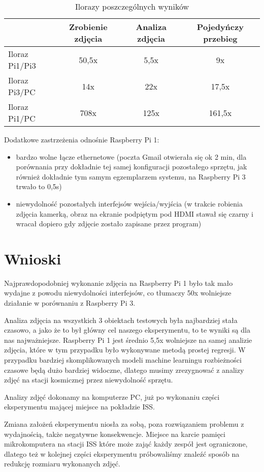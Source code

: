 \begin{table}[H]
    \centering
    \begin{threeparttable}
        \caption{Ilorazy poszczególnych wyników}
        \begin{tabular}{|lccc|}
            \toprule
            & Zrobienie zdjęcia & Analiza zdjęcia & Pojedyńczy przebieg \\
            \midrule
            Iloraz Pi1/Pi3 & 50,5x & 5,5x & 9x \\
            Iloraz Pi3/PC & 14x & 22x & 17,5x \\
            Iloraz Pi1/PC & 708x & 125x & 161,5x \\
            \bottomrule
        \end{tabular}
    \end{threeparttable}
\end{table}

\large Dodatkowe zastrzeżenia odnośnie Raspberry Pi 1: \normalsize
\begin{itemize}
    \item bardzo wolne łącze ethernetowe
    \footnotesize (poczta Gmail otwierała się ok 2 min, dla porównania przy dokładnie
    tej samej konfiguracji pozostałego sprzętu, jak również dokładnie tym samym egzemplarzem systemu, na
    Raspberry Pi 3 trwało to 0,5s) \normalsize \\
    \item niewydolność pozostałych interfejsów wejścia/wyjścia
    \footnotesize (w trakcie robienia zdjęcia kamerką, obraz
    na ekranie podpiętym pod HDMI stawał się czarny i wracał dopiero gdy zdjęcie zostało zapisane przez
    program) \normalsize \\
\end{itemize}

\section{Wnioski}\label{sec:performance_conclusion}

Najprawdopodobniej wykonanie zdjęcia na Raspberry Pi 1 było tak mało wydajne z powodu
niewydolności interfejsów, co tłumaczy 50x wolniejsze działanie w porównaniu z Raspberry Pi 3.

Analiza zdjęcia na wszystkich 3 obiektach testowych była najbardziej stała czasowo, a jako
że to był główny cel naszego eksperymentu, to te wyniki są dla nas najważniejsze. Raspberry Pi 1
jest średnio 5,5x wolniejsze na samej analizie zdjęcia, które w tym przypadku było wykonywane
metodą prostej regresji. W przypadku bardziej skomplikowanych modeli machine learningu
rozbieżności czasowe będą dużo bardziej widoczne, dlatego musimy zrezygnować z analizy zdjęć
na stacji kosmicznej przez niewydolność sprzętu.

Analizy zdjęć dokonamy na komputerze PC, już po wykonaniu części eksperymentu mającej
miejsce na pokładzie ISS.

Zmiana założeń eksperymentu niosła za sobą, poza rozwiązaniem problemu z wydajnością, także negatywne
konsekwencje. Miejsce na karcie pamięci mikrokomputera na stacji ISS które może zająć każdy zespół jest
ograniczone, dlatego też w kolejnej części eksperymentu próbowaliśmy znaleźć sposób na redukcję rozmiaru
wykonanych zdjęć.
